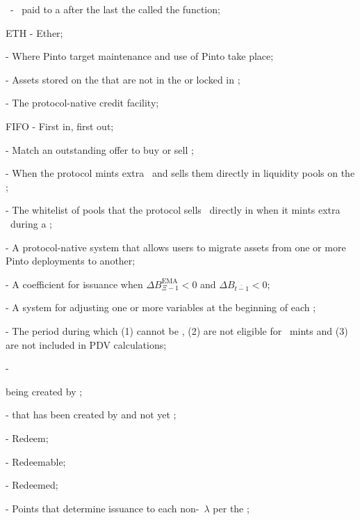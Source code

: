 \documentclass[class=article, crop=false]{standalone}
\begin{document}
\begin{itemize}[topsep=0pt, itemsep=2pt,leftmargin=16pt]
    \item[]  \Pinto\ - \Pinto\ paid to a  after the last  the  called the  function;
    \item[] ETH - Ether;
    \item[]  - Where Pinto target maintenance and use of Pinto take place;
    \item[]  - Assets stored on the  that are not  in the  or locked in ;
    \item[]  - The protocol-native credit facility;
    \item[] FIFO - First in, first out;
    \item[]  - Match an outstanding offer to buy or sell ;
    \item[]  - When the protocol mints extra \Pinto\ and sells them directly in liquidity pools on the ;
    \item[]  - The whitelist of pools that the protocol sells \Pinto\ directly in when it mints extra \Pinto\ during a ;
    \item[]  - A protocol-native system that allows users to migrate assets from one or more Pinto deployments to another;
    \item[]  - A coefficient for  issuance when $\Delta B_{\Xi-1}^{\text{EMA}} < 0$ and $\Delta B_{\overline{t-1}} < 0$;
    \item[]  - A system for adjusting one or more variables at the beginning of each ;
    \item[]  - The period during which  (1) cannot be , (2) are not eligible for \Pinto\ mints and (3) are not included in  PDV calculations;
    \item[]  - { being created by ;
    \item[]  -  that has been created by  and not yet ;
    \item[]  - Redeem;
    \item[]  - Redeemable;
    \item[]  - Redeemed;
    \item[]  - Points that determine  issuance to each non-\Pinto\ $\lambda$ per the ;
}
\end{itemize}
\end{document}
